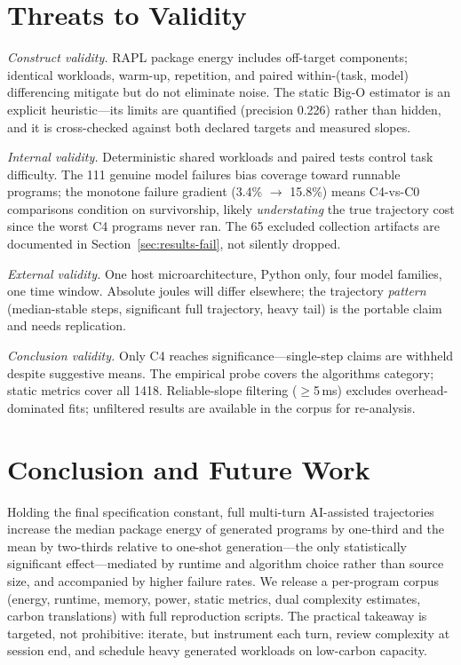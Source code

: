 \documentclass[journal]{IEEEtran}
\begin{document}
\section{Threats to Validity}\label{sec:threats}
\emph{Construct validity.} RAPL package energy includes off-target
components; identical workloads, warm-up, repetition, and paired
within-(task, model) differencing mitigate but do not eliminate noise. The
static Big-O estimator is an explicit heuristic---its limits are quantified
(precision 0.226) rather than hidden, and it is cross-checked against both
declared targets and measured slopes.

\emph{Internal validity.} Deterministic shared workloads and paired tests
control task difficulty. The 111 genuine model failures bias coverage toward
runnable programs; the monotone failure gradient (3.4\% $\rightarrow$ 15.8\%)
means C4-vs-C0 comparisons condition on survivorship, likely
\emph{understating} the true trajectory cost since the worst C4 programs
never ran. The 65 excluded collection artifacts are documented in
Section~\ref{sec:results-fail}, not silently dropped.

\emph{External validity.} One host microarchitecture, Python only, four
model families, one time window. Absolute joules will differ elsewhere; the trajectory \emph{pattern}
(median-stable steps, significant full trajectory, heavy tail) is the
portable claim and needs replication.

\emph{Conclusion validity.} Only C4 reaches significance---single-step
claims are withheld despite suggestive means. The empirical probe covers the
algorithms category; static metrics cover all 1418. Reliable-slope
filtering ($\geq$5\,ms) excludes overhead-dominated fits; unfiltered results
are available in the corpus for re-analysis.

\section{Conclusion and Future Work}\label{sec:conclusion}
Holding the final specification constant, full multi-turn AI-assisted
trajectories increase the median package energy of generated programs by
one-third and the mean by two-thirds relative to one-shot generation---the
only statistically significant effect---mediated by runtime and algorithm
choice rather than source size, and accompanied by higher failure rates. We
release a per-program corpus (energy, runtime, memory, power, static
metrics, dual complexity estimates, carbon translations) with full
reproduction scripts. The practical takeaway is targeted, not prohibitive:
iterate, but instrument each turn, review complexity at session end, and
schedule heavy generated workloads on low-carbon capacity.
\end{document}
